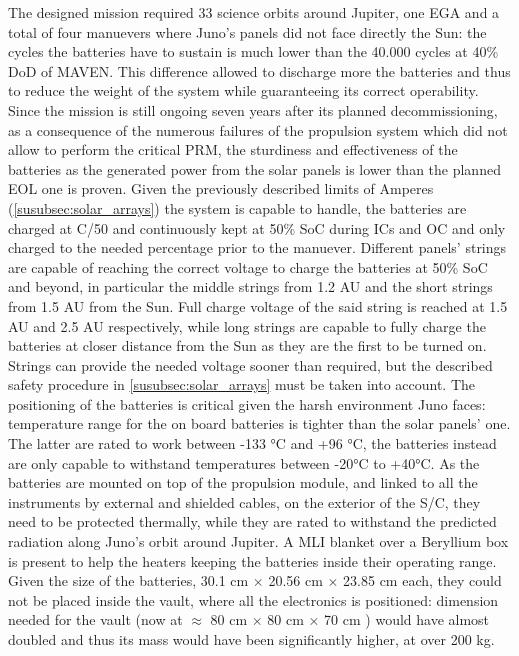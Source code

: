 The designed mission required 33 science orbits around Jupiter, one EGA and a total of four manuevers where Juno's panels did not face directly the Sun: the cycles the batteries have to sustain is much lower than the 40.000 cycles at 40\% DoD of MAVEN. This difference allowed to discharge more the batteries and thus to reduce the weight of the system while guaranteeing its correct operability. Since the mission is still ongoing seven years after its planned decommissioning, as a consequence of the numerous failures of the propulsion system which did not allow to perform the critical PRM, the sturdiness and effectiveness of the batteries as the generated power from the solar panels is lower than the planned EOL one is proven. Given the previously described limits of Amperes (\autoref{susubsec:solar_arrays}) the system is capable to handle, the batteries are charged at C/50 and continuously kept at 50\% SoC during ICs and OC and only charged to the needed percentage prior to the manuever. Different panels' strings are capable of reaching the correct voltage to charge the batteries at 50\% SoC and beyond, in particular the middle strings from 1.2 AU and the short strings from 1.5 AU from the Sun. Full charge voltage of the said string is reached at 1.5 AU and 2.5 AU respectively, while long strings are capable to fully charge the batteries at closer distance from the Sun as they are the first to be turned on. Strings can provide the needed voltage sooner than required, but the described safety procedure in \autoref{susubsec:solar_arrays} must be taken into account.\cite{solar_panels_coef} The positioning of the batteries is critical given the harsh environment Juno faces: temperature range for the on board batteries is tighter than the solar panels' one. The latter are rated to work between -133 °C and +96 °C, the batteries instead are only capable to withstand temperatures between -20°C to +40°C. As the batteries are mounted on top of the propulsion module, and linked to all the instruments by external and shielded cables, on the exterior of the S/C, they need to be protected thermally, while they are rated to withstand the predicted radiation along Juno's orbit around Jupiter.\cite{batteries_position} A MLI blanket over a Beryllium box is present to help the heaters keeping the batteries inside their operating range. Given the size of the batteries, 30.1 cm $\times$ 20.56 cm $\times$ 23.85 cm each, they could not be placed inside the vault, where all the electronics is positioned: dimension needed for the vault (now at  $\approx$ 80 cm $\times$ 80 cm $\times$ 70 cm ) would have almost doubled and thus its mass would have been significantly higher, at over 200 kg.\cite{batteries_position}

